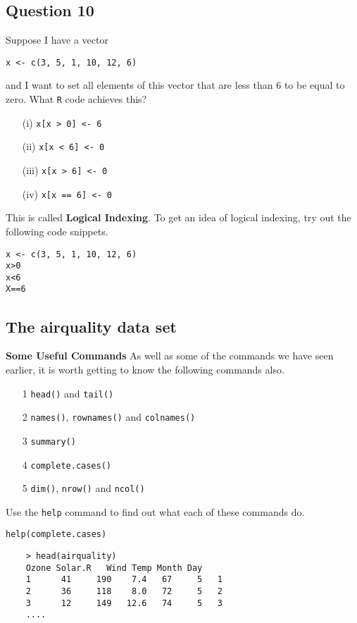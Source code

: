 \documentclass[12pt]{article}
\begin{document}
\newpage
\subsection*{Question 10}
\Large
Suppose I have a vector 
\begin{verbatim}
x <- c(3, 5, 1, 10, 12, 6) 
\end{verbatim}
and I want to set all elements of this vector that are less than 6 to be equal to zero. What \texttt{R} code achieves this?
\begin{itemize}
\item[(i)] \texttt{x[x > 0] <- 6}
\item[(ii)]\texttt{x[x < 6] <- 0}
\item[(iii)] \texttt{x[x > 6] <- 0}
\item[(iv)] \texttt{x[x == 6] <- 0}
\end{itemize}
\bigskip
\noindent This is called \textbf{Logical Indexing}. To get an idea of logical indexing, try out the following code snippets.
\begin{framed}
\begin{verbatim}
x <- c(3, 5, 1, 10, 12, 6) 
x>0
x<6
X==6
\end{verbatim}
\end{framed}
\newpage
\subsection*{The airquality data set}

\textbf{Some Useful Commands}
As well as some of the commands we have seen earlier, it is worth getting to know the following commands also.
\begin{itemize}
\item[1] \texttt{head()} and \texttt{tail()}
\item[2] \texttt{names()}, \texttt{rownames()} and \texttt{colnames()}
\item[3] \texttt{summary()}
\item[4] \texttt{complete.cases()}
\item[5] \texttt{dim()}, \texttt{nrow()} and \texttt{ncol()}
\end{itemize}
Use the \texttt{help} command to find out what each of these commands do.
\begin{framed}
\begin{verbatim}
help(complete.cases)
\end{verbatim}
\end{framed}
\begin{framed}
	\begin{verbatim}
	> head(airquality)
	Ozone Solar.R  	Wind Temp Month Day
	1      41     190    7.4   67     5   1
	2      36     118    8.0   72     5   2
	3      12     149   12.6   74     5   3
	....
	\end{verbatim}
\end{framed}
\end{document}
